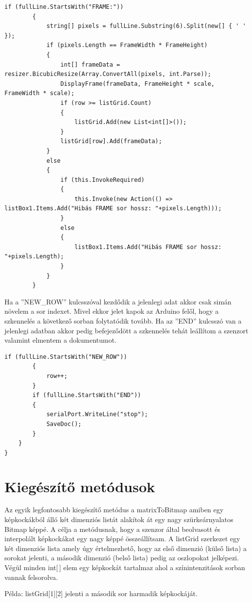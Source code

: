\documentclass[]{thesis-ekf}
\theoremstyle{definition}
\theoremstyle{remark}
\begin{document}
\begin{lstlisting}[language=CSharp]
		if (fullLine.StartsWith("FRAME:"))
		{
			string[] pixels = fullLine.Substring(6).Split(new[] { ' ' });
			if (pixels.Length == FrameWidth * FrameHeight)
			{
				int[] frameData = resizer.BicubicResize(Array.ConvertAll(pixels, int.Parse));
				DisplayFrame(frameData, FrameHeight * scale, FrameWidth * scale);
				if (row >= listGrid.Count)
				{
					listGrid.Add(new List<int[]>());
				}
				listGrid[row].Add(frameData);
			}
			else
			{
				if (this.InvokeRequired)
				{
					this.Invoke(new Action(() => listBox1.Items.Add("Hibás FRAME sor hossz: "+pixels.Length)));
				}
				else
				{
					listBox1.Items.Add("Hibás FRAME sor hossz: "+pixels.Length);
				}
			}
		}
\end{lstlisting}
Ha a ''NEW\_ROW'' kulcsszóval kezdődik a jelenlegi adat akkor csak simán növelem a sor indexet. Mivel ekkor jelet kapok az Arduino felől, hogy a szkennelés a következő sorban folytatódik tovább. Ha az ''END'' kulcsszó van a jelenlegi adatban akkor pedig befejeződött a szkennelés tehát leállítom a szenzort valamint elmentem a dokumentumot.
\begin{lstlisting}[language=CSharp]
		if (fullLine.StartsWith("NEW_ROW"))
		{
			row++;	
		}
		if (fullLine.StartsWith("END"))
		{
			serialPort.WriteLine("stop");
			SaveDoc();
		}
	}
}
\end{lstlisting}
\section{Kiegészítő metódusok}
Az egyik legfontosabb kiegészítő metódus a matrixToBitmap amiben egy képkockákból álló két dimenziós listát alakítok át egy nagy szürkeárnyalatos Bitmap\cite{bitmap.class} képpé. A célja a metódusnak, hogy a szenzor által beolvasott és interpolált képkockákat egy nagy képpé összeállítsam. A listGrid szerkezet egy két dimenziós lista amely úgy értelmezhető, hogy az első dimenzió (külső lista) a sorokat jelenti, a második dimenzió (belső lista) pedig az oszlopokat jelképezi. Végül minden int[\,] elem egy képkockát tartalmaz ahol a színintenzitások sorban vannak felsorolva. 

Példa: listGrid[1][2] jelenti a második sor harmadik képkockáját.
\end{document}
